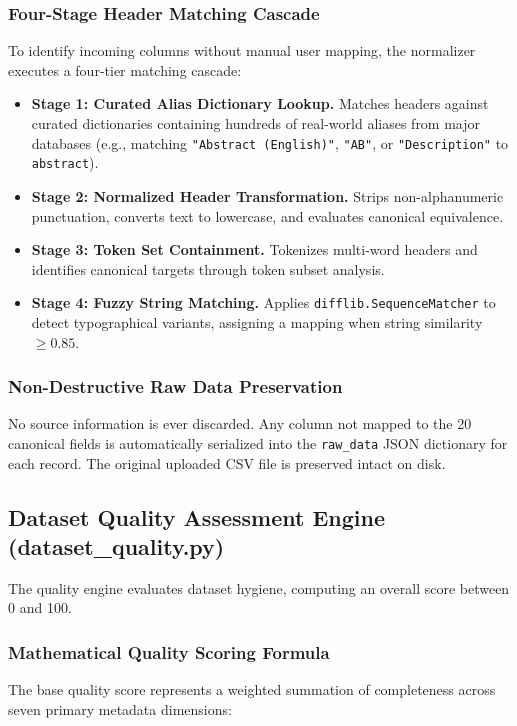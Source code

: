 \subsubsection{Four-Stage Header Matching Cascade}
To identify incoming columns without manual user mapping, the normalizer executes a four-tier matching cascade:
\begin{itemize}
    \item \textbf{Stage 1: Curated Alias Dictionary Lookup.} Matches headers against curated dictionaries containing hundreds of real-world aliases from major databases (e.g., matching \texttt{"Abstract (English)"}, \texttt{"AB"}, or \texttt{"Description"} to \texttt{abstract}).
    \item \textbf{Stage 2: Normalized Header Transformation.} Strips non-alphanumeric punctuation, converts text to lowercase, and evaluates canonical equivalence.
    \item \textbf{Stage 3: Token Set Containment.} Tokenizes multi-word headers and identifies canonical targets through token subset analysis.
    \item \textbf{Stage 4: Fuzzy String Matching.} Applies \texttt{difflib.SequenceMatcher} to detect typographical variants, assigning a mapping when string similarity $\ge 0.85$.
\end{itemize}

\subsubsection{Non-Destructive Raw Data Preservation}
No source information is ever discarded. Any column not mapped to the 20 canonical fields is automatically serialized into the \texttt{raw\_data} JSON dictionary for each record. The original uploaded CSV file is preserved intact on disk.

\subsection{Dataset Quality Assessment Engine (dataset\_quality.py)}
The quality engine evaluates dataset hygiene, computing an overall score between 0 and 100.

\subsubsection{Mathematical Quality Scoring Formula}
The base quality score represents a weighted summation of completeness across seven primary metadata dimensions:

